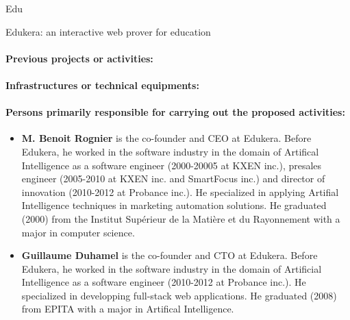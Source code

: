 \begin{sitedescription}{Edu}
\begin{compactitem}
    \item Edukera: an interactive web prover for education
\end{compactitem}

\paragraph{Previous projects or activities:}


\begin{compactitem}
\item
\end{compactitem}

\paragraph{Infrastructures or technical equipments:}


\paragraph{Persons primarily responsible for carrying out the proposed activities:}

\begin{itemize} %
\item{\bf M. Benoit Rognier} is the co-founder and CEO at Edukera.
Before Edukera, he worked in the software industry in the domain of Artifical Intelligence
as a software engineer (2000-20005 at KXEN inc.), presales engineer (2005-2010 at KXEN inc.
and SmartFocus inc.) and director of innovation (2010-2012 at Probance inc.).
He specialized in applying Artifial Intelligence techniques in marketing automation solutions.
He graduated (2000) from the Institut Supérieur de la Matière et du Rayonnement
with a major in computer science.

\item{\bf Guillaume Duhamel} is the co-founder and CTO at Edukera.
Before Edukera, he worked in the software industry in the domain of Artificial Intelligence
as a software engineer (2010-2012 at Probance inc.). He specialized in developping full-stack web applications.
He graduated (2008) from EPITA with a major in Artifical Intelligence.

\end{itemize}

\end{sitedescription}

